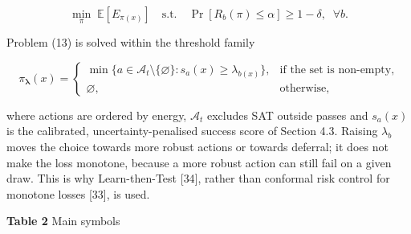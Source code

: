 \documentclass[
  11pt,
]{article}
\begin{document}
\[\min_{\pi}\;\mathbb{E}\left[E_{\pi(x)}\right]\quad\text{s.t.}\quad \Pr\left[R_b(\pi)\le\alpha\right]\ge 1-\delta,\;\;\forall b. \tag{13}\]

Problem (13) is solved within the threshold family

\[\pi_{\boldsymbol\lambda}(x)=\begin{cases}\min\{a\in\mathcal{A}_t\setminus\{\varnothing\}:s_a(x)\ge\lambda_{b(x)}\}, & \text{if the set is non-empty},\\ \varnothing, & \text{otherwise},\end{cases} \tag{14}\]

where actions are ordered by energy, \(\mathcal{A}_t\) excludes SAT
outside passes and \(s_a(x)\) is the calibrated, uncertainty-penalised
success score of Section 4.3. Raising \(\lambda_b\) moves the choice
towards more robust actions or towards deferral; it does not make the
loss monotone, because a more robust action can still fail on a given
draw. This is why Learn-then-Test {[}34{]}, rather than conformal risk
control for monotone losses {[}33{]}, is used.


\textbf{Table 2} Main symbols
\end{document}
